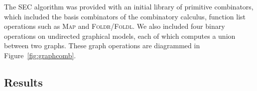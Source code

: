 \documentclass{article} %
\begin{document}
The SEC algorithm was provided with an initial library of primitive  combinators, which included the basis combinators of the combinatory calculus, function list operations such as \textsc{Map} and \textsc{Foldr}/\textsc{Foldl}. We also included four binary operations on undirected graphical models, each of which computes a union between two graphs. These graph operations are diagrammed in Figure~\ref{fig:graphcomb}.




\subsection{Results}
\end{document}
